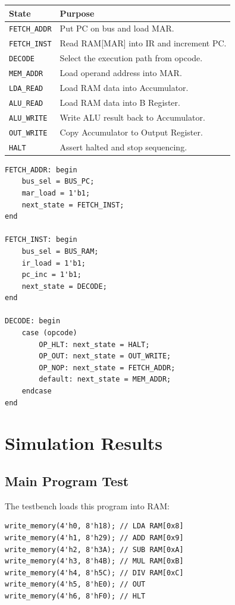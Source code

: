 \documentclass[12pt,a4paper]{article}
\begin{document}
\begin{center}
\begin{tabular}{l l}
\toprule
State & Purpose \\
\midrule
\texttt{FETCH\_ADDR} & Put PC on bus and load MAR. \\
\texttt{FETCH\_INST} & Read RAM[MAR] into IR and increment PC. \\
\texttt{DECODE} & Select the execution path from opcode. \\
\texttt{MEM\_ADDR} & Load operand address into MAR. \\
\texttt{LDA\_READ} & Load RAM data into Accumulator. \\
\texttt{ALU\_READ} & Load RAM data into B Register. \\
\texttt{ALU\_WRITE} & Write ALU result back to Accumulator. \\
\texttt{OUT\_WRITE} & Copy Accumulator to Output Register. \\
\texttt{HALT} & Assert halted and stop sequencing. \\
\bottomrule
\end{tabular}
\end{center}

\begin{lstlisting}[style=verilogstyle,caption={Fetch and decode examples from control\_unit.v}]
FETCH_ADDR: begin
    bus_sel = BUS_PC;
    mar_load = 1'b1;
    next_state = FETCH_INST;
end

FETCH_INST: begin
    bus_sel = BUS_RAM;
    ir_load = 1'b1;
    pc_inc = 1'b1;
    next_state = DECODE;
end

DECODE: begin
    case (opcode)
        OP_HLT: next_state = HALT;
        OP_OUT: next_state = OUT_WRITE;
        OP_NOP: next_state = FETCH_ADDR;
        default: next_state = MEM_ADDR;
    endcase
end
\end{lstlisting}

\section{Simulation Results}

\subsection{Main Program Test}

The testbench loads this program into RAM:

\begin{lstlisting}[style=verilogstyle,caption={Main program loaded in sap1\_tb.v}]
write_memory(4'h0, 8'h18); // LDA RAM[0x8]
write_memory(4'h1, 8'h29); // ADD RAM[0x9]
write_memory(4'h2, 8'h3A); // SUB RAM[0xA]
write_memory(4'h3, 8'h4B); // MUL RAM[0xB]
write_memory(4'h4, 8'h5C); // DIV RAM[0xC]
write_memory(4'h5, 8'hE0); // OUT
write_memory(4'h6, 8'hF0); // HLT
\end{lstlisting}
\end{document}
